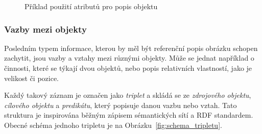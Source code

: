 \begin{figure}[ht!]
	\centering
	\caption{Příklad použití atributů pro popis objektu}\label{fig:example_tshirt}
\end{figure}


\subsubsection{Vazby mezi objekty}
Posledním typem informace, kterou by měl být referenční popis obrázku schopen zachytit, jsou vazby a vztahy mezi různými objekty.
Může se jednat například o činnosti, které se týkají dvou objektů, nebo popis relativních vlastností, jako je velikost či pozice.

Každý takový záznam je označen jako \emph{triplet} a skládá se ze \emph{zdrojového objektu},
\emph{cílového objektu} a \emph{predikátu}, který popisuje danou vazbu nebo vztah.
Tato struktura je inspirována běžným zápisem sémantických sítí a RDF standardem. 
Obecné schéma jednoho tripletu je na Obrázku~\ref{fig:schema_tripletu}.


